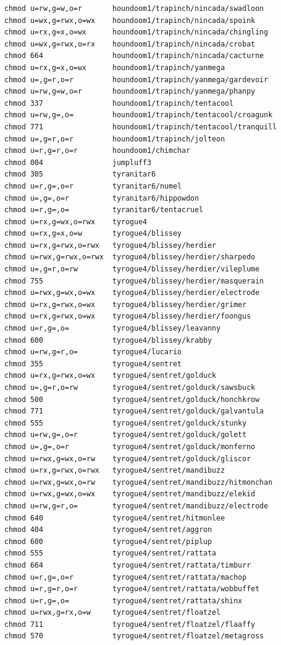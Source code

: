 \documentclass{article}
\begin{document}
\begin{lstlisting}
chmod u=rw,g=w,o=r       houndoom1/trapinch/nincada/swadloon
chmod u=wx,g=rwx,o=wx    houndoom1/trapinch/nincada/spoink
chmod u=rx,g=x,o=wx      houndoom1/trapinch/nincada/chingling
chmod u=wx,g=rwx,o=rx    houndoom1/trapinch/nincada/crobat
chmod 664                houndoom1/trapinch/nincada/cacturne
chmod u=rx,g=x,o=wx      houndoom1/trapinch/yanmega
chmod u=,g=r,o=r         houndoom1/trapinch/yanmega/gardevoir
chmod u=rw,g=w,o=r       houndoom1/trapinch/yanmega/phanpy
chmod 337                houndoom1/trapinch/tentacool
chmod u=rw,g=,o=         houndoom1/trapinch/tentacool/croagunk
chmod 771                houndoom1/trapinch/tentacool/tranquill
chmod u=,g=r,o=r         houndoom1/trapinch/jolteon
chmod u=r,g=r,o=r        houndoom1/chimchar
chmod 004                jumpluff3
chmod 305                tyranitar6
chmod u=r,g=,o=r         tyranitar6/numel
chmod u=,g=,o=r          tyranitar6/hippowdon
chmod u=r,g=,o=          tyranitar6/tentacruel
chmod u=rx,g=wx,o=rwx    tyrogue4
chmod u=rx,g=x,o=w       tyrogue4/blissey
chmod u=rx,g=rwx,o=rwx   tyrogue4/blissey/herdier
chmod u=rwx,g=rwx,o=rwx  tyrogue4/blissey/herdier/sharpedo
chmod u=,g=r,o=rw        tyrogue4/blissey/herdier/vileplume
chmod 755                tyrogue4/blissey/herdier/masquerain
chmod u=rwx,g=wx,o=wx    tyrogue4/blissey/herdier/electrode
chmod u=rx,g=rwx,o=wx    tyrogue4/blissey/herdier/grimer
chmod u=rx,g=rwx,o=wx    tyrogue4/blissey/herdier/foongus
chmod u=r,g=,o=          tyrogue4/blissey/leavanny
chmod 600                tyrogue4/blissey/krabby
chmod u=rw,g=r,o=        tyrogue4/lucario
chmod 355                tyrogue4/sentret
chmod u=rx,g=rwx,o=wx    tyrogue4/sentret/golduck
chmod u=,g=r,o=rw        tyrogue4/sentret/golduck/sawsbuck
chmod 500                tyrogue4/sentret/golduck/honchkrow
chmod 771                tyrogue4/sentret/golduck/galvantula
chmod 555                tyrogue4/sentret/golduck/stunky
chmod u=rw,g=,o=r        tyrogue4/sentret/golduck/golett
chmod u=,g=,o=r          tyrogue4/sentret/golduck/monferno
chmod u=rwx,g=wx,o=rw    tyrogue4/sentret/golduck/gliscor
chmod u=rx,g=rwx,o=rwx   tyrogue4/sentret/mandibuzz
chmod u=rwx,g=wx,o=rw    tyrogue4/sentret/mandibuzz/hitmonchan
chmod u=rwx,g=wx,o=wx    tyrogue4/sentret/mandibuzz/elekid
chmod u=rw,g=r,o=        tyrogue4/sentret/mandibuzz/electrode
chmod 640                tyrogue4/sentret/hitmonlee
chmod 404                tyrogue4/sentret/aggron
chmod 600                tyrogue4/sentret/piplup
chmod 555                tyrogue4/sentret/rattata
chmod 664                tyrogue4/sentret/rattata/timburr
chmod u=r,g=,o=r         tyrogue4/sentret/rattata/machop
chmod u=r,g=r,o=r        tyrogue4/sentret/rattata/wobbuffet
chmod u=r,g=,o=          tyrogue4/sentret/rattata/shinx
chmod u=rwx,g=rx,o=w     tyrogue4/sentret/floatzel
chmod 711                tyrogue4/sentret/floatzel/flaaffy
chmod 570                tyrogue4/sentret/floatzel/metagross
\end{lstlisting}
\newpage
\end{document}
